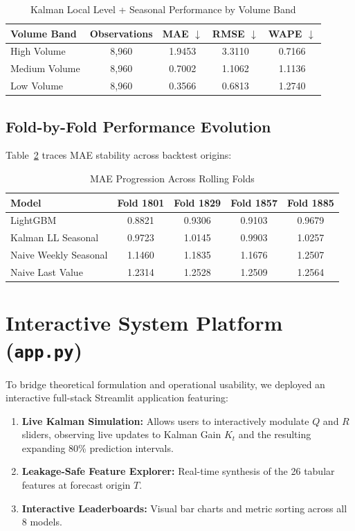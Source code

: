 \documentclass[conference]{IEEEtran}
\begin{document}
\begin{table}[htbp]
\caption{Kalman Local Level + Seasonal Performance by Volume Band}
\centering
\begin{tabular}{lcccc}
\toprule
\textbf{Volume Band} & \textbf{Observations} & \textbf{MAE $\downarrow$} & \textbf{RMSE $\downarrow$} & \textbf{WAPE $\downarrow$} \\
\midrule
High Volume & 8,960 & 1.9453 & 3.3110 & 0.7166 \\
Medium Volume & 8,960 & 0.7002 & 1.1062 & 1.1136 \\
Low Volume & 8,960 & 0.3566 & 0.6813 & 1.2740 \\
\bottomrule
\end{tabular}
\label{tab:volume_band}
\end{table}

\subsection{Fold-by-Fold Performance Evolution}
Table~\ref{tab:folds} traces MAE stability across backtest origins:

\begin{table}[htbp]
\caption{MAE Progression Across Rolling Folds}
\centering
\begin{tabular}{lcccc}
\toprule
\textbf{Model} & \textbf{Fold 1801} & \textbf{Fold 1829} & \textbf{Fold 1857} & \textbf{Fold 1885} \\
\midrule
LightGBM & 0.8821 & 0.9306 & 0.9103 & 0.9679 \\
Kalman LL Seasonal & 0.9723 & 1.0145 & 0.9903 & 1.0257 \\
Naive Weekly Seasonal & 1.1460 & 1.1835 & 1.1676 & 1.2507 \\
Naive Last Value & 1.2314 & 1.2528 & 1.2509 & 1.2564 \\
\bottomrule
\end{tabular}
\label{tab:folds}
\end{table}

\section{Interactive System Platform (\texttt{app.py})}
To bridge theoretical formulation and operational usability, we deployed an interactive full-stack Streamlit application featuring:
\begin{enumerate}
    \item \textbf{Live Kalman Simulation:} Allows users to interactively modulate $Q$ and $R$ sliders, observing live updates to Kalman Gain $K_t$ and the resulting expanding 80\% prediction intervals.
    \item \textbf{Leakage-Safe Feature Explorer:} Real-time synthesis of the 26 tabular features at forecast origin $T$.
    \item \textbf{Interactive Leaderboards:} Visual bar charts and metric sorting across all 8 models.
\end{enumerate}
\end{document}
